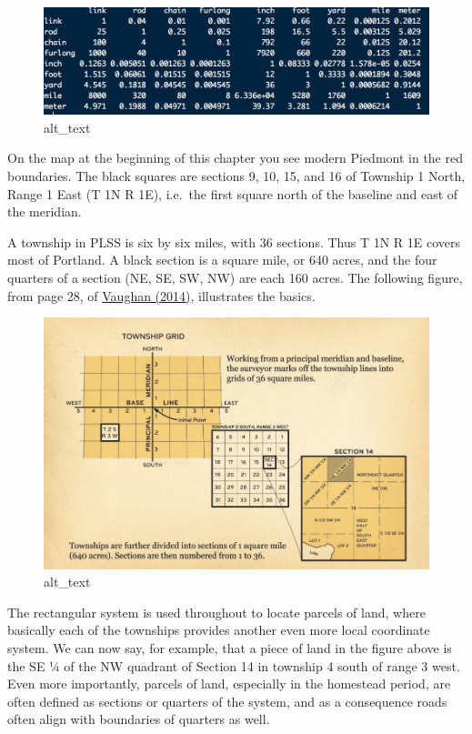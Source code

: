 \documentclass[
  12pt,
]{book}
\begin{document}
\begin{figure}
\centering
\includegraphics{images/02_images/image3.png}
\caption{alt\_text}
\end{figure}

On the map at the beginning of this chapter you see modern Piedmont in the red boundaries. The black squares are sections 9, 10, 15, and 16 of Township 1 North, Range 1 East (T 1N R 1E), i.e.~the first square north of the baseline and east of the meridian.

A township in PLSS is six by six miles, with 36 sections. Thus T 1N R 1E covers most of Portland. A black section is a square mile, or 640 acres, and the four quarters of a section (NE, SE, SW, NW) are each 160 acres. The following figure, from page 28, of \href{https://www.blm.gov/or/landsrealty/glo200/files/glo-book.pdf}{Vaughan (2014)}, illustrates the basics.

\begin{figure}
\centering
\includegraphics{images/02_images/image4.png}
\caption{alt\_text}
\end{figure}

The rectangular system is used throughout to locate parcels of land, where basically each of the townships provides another even more local coordinate system. We can now say, for example, that a piece of land in the figure above is the SE ¼ of the NW quadrant of Section 14 in township 4 south of range 3 west. Even more importantly, parcels of land, especially in the homestead period, are often defined as sections or quarters of the system, and as a consequence roads often align with boundaries of quarters as well.
\end{document}
